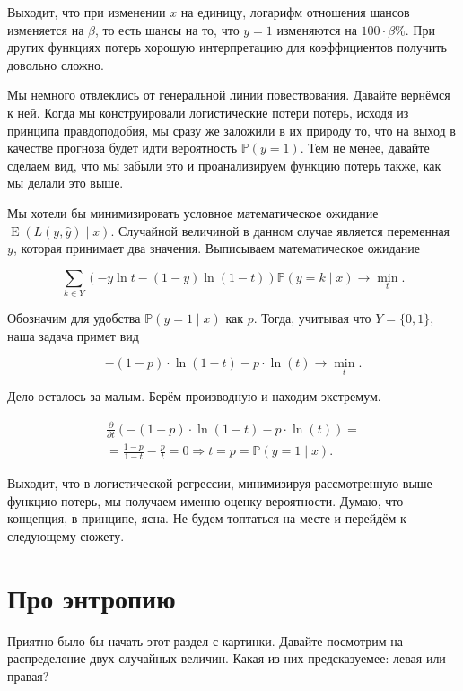 \documentclass[12pt, a4paper, oneside]{extreport}
\DeclareMathOperator{\E}{\mathop{E}}
\def \b{\beta}
\def \mbb{\mathbb}
\def \PP{\mbb{P}}
\theoremstyle{plain}              %
\theoremstyle{definition}         %
\begin{document}
Выходит, что при изменении $x$ на единицу, логарифм отношения шансов изменяется на $\b$, то есть шансы на то, что $y=1$ изменяются на $100 \cdot \b \%$. При других функциях потерь хорошую интерпретацию для коэффициентов получить довольно сложно.

Мы немного отвлеклись от генеральной линии повествования. Давайте вернёмся к ней. Когда мы конструировали логистические потери потерь, исходя из принципа правдоподобия, мы сразу же заложили в их природу то, что на выход в качестве прогноза будет идти вероятность $\PP(y = 1)$. Тем не менее, давайте сделаем вид, что мы забыли это и проанализируем функцию потерь также, как мы делали это выше. 

Мы хотели бы минимизировать условное математическое ожидание  $\E(L(y, \hat y) \mid x)$. Случайной величиной в данном случае является переменная $y$, которая принимает два значения. Выписываем математическое ожидание

\[ 
\sum_{k \in Y} (-y \ln t - (1-y) \ln(1-t)) \PP(y = k \mid x) \to \min_t.
\] 

Обозначим для удобства $\PP(y = 1 \mid x)$ как $p$. Тогда, учитывая что $Y = \{0,1\}$, наша задача примет вид 

\[ 
-(1-p) \cdot \ln(1-t) - p \cdot \ln(t) \to \min_t.
\]

Дело осталось за малым. Берём производную и находим экстремум. 

\begin{multline*}
\frac{\partial }{\partial t} \left(  -(1-p) \cdot \ln(1-t) - p \cdot \ln(t) \right) = \\ = \frac{1-p}{1-t} - \frac{p}{t} = 0   \Rightarrow t = p = \PP(y = 1 \mid x).
\end{multline*}

Выходит, что в логистической регрессии, минимизируя рассмотренную выше функцию потерь, мы получаем именно оценку вероятности.  Думаю, что концепция, в принципе, ясна. Не будем топтаться на месте и перейдём к следующему сюжету. 

\section{ Про энтропию} 

Приятно было бы начать этот раздел с картинки. Давайте посмотрим на распределение двух случайных величин. Какая из них предсказуемее: левая или правая? 
\end{document}
